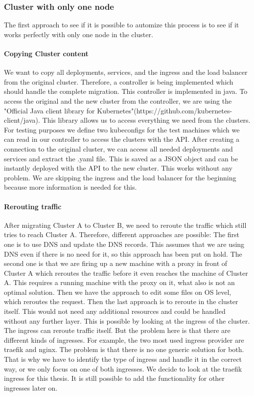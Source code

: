 \subsubsection{Cluster with only one node}
%
The first approach to see if it is possible to automize this process is to see if it works perfectly with only one node in the cluster.
\paragraph{Copying Cluster content}
We want to copy all deployments, services, and the ingress and the load balancer from the original cluster. Therefore, a controller is being implemented which should handle the complete migration. This controller is implemented in java. To access the original and the new cluster from the controller, we are using the "Official Java client library for Kubernetes"(https://github.com/kubernetes-client/java). This library allows us to access everything we need from the clusters. For testing purposes we define two kubeconfigs for the test machines which we can read in our controller to access the clusters with the API. After creating a connection to the original cluster, we can access all needed deployments and services and extract the .yaml file. This is saved as a JSON object and can be instantly deployed with the API to the new cluster. This works without any problem. We are skipping the ingress and the load balancer for the beginning because more information is needed for this.
%
\paragraph{Rerouting traffic}
After migrating Cluster A to Cluster B, we need to reroute the traffic which still tries to reach Cluster A. Therefore, different approaches are possible: The first one is to use DNS and update the DNS records. This assumes that we are using DNS even if there is no need for it, so this approach has been put on hold. The second one is that we are firing up a new machine with a proxy in front of Cluster A which reroutes the traffic before it even reaches the machine of Cluster A. This requires a running machine with the proxy on it, what also is not an optimal solution. Then we have the approach to edit some files on OS level, which reroutes the request.  Then the last approach is to reroute in the cluster itself. This would not need any additional resources and could be handled without any further layer. This is possible by looking at the ingress of the cluster. The ingress can reroute traffic itself. But the problem here is that there are different kinds of ingresses. For example, the two most used ingress provider are traefik and nginx. The problem is that there is no one generic solution for both. That is why we have to identify the type of ingress and handle it in the correct way, or we only focus on one of both ingresses. We decide to look at the traefik ingress for this thesis. It is still possible to add the functionality for other ingresses later on.
%
